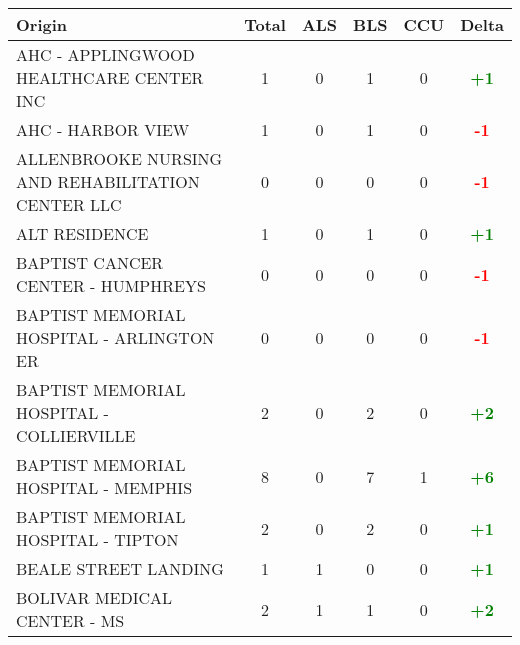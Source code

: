 \documentclass{article}
\begin{document}
\begin{longtable}{l|cccc|c}
\toprule
Origin & Total & ALS & BLS & CCU & Delta \\
\midrule

    
        AHC - APPLINGWOOD HEALTHCARE CENTER INC & 1 & 0 & 1 & 0 & \textcolor{green}{\textbf{+1}} \\
    

    
        AHC - HARBOR VIEW & 1 & 0 & 1 & 0 & \textcolor{red}{\textbf{-1}} \\
    

    
        ALLENBROOKE NURSING AND REHABILITATION CENTER LLC & 0 & 0 & 0 & 0 & \textcolor{red}{\textbf{-1}} \\
    

    
        ALT RESIDENCE & 1 & 0 & 1 & 0 & \textcolor{green}{\textbf{+1}} \\
    

    
        BAPTIST CANCER CENTER - HUMPHREYS & 0 & 0 & 0 & 0 & \textcolor{red}{\textbf{-1}} \\
    

    
        BAPTIST MEMORIAL HOSPITAL -  ARLINGTON ER & 0 & 0 & 0 & 0 & \textcolor{red}{\textbf{-1}} \\
    

    
        BAPTIST MEMORIAL HOSPITAL - COLLIERVILLE & 2 & 0 & 2 & 0 & \textcolor{green}{\textbf{+2}} \\
    

    
        BAPTIST MEMORIAL HOSPITAL - MEMPHIS & 8 & 0 & 7 & 1 & \textcolor{green}{\textbf{+6}} \\
    

    
        BAPTIST MEMORIAL HOSPITAL - TIPTON & 2 & 0 & 2 & 0 & \textcolor{green}{\textbf{+1}} \\
    

    
        BEALE STREET LANDING & 1 & 1 & 0 & 0 & \textcolor{green}{\textbf{+1}} \\
    

    
        BOLIVAR MEDICAL CENTER - MS & 2 & 1 & 1 & 0 & \textcolor{green}{\textbf{+2}} \\
    


\end{longtable}
\end{document}

